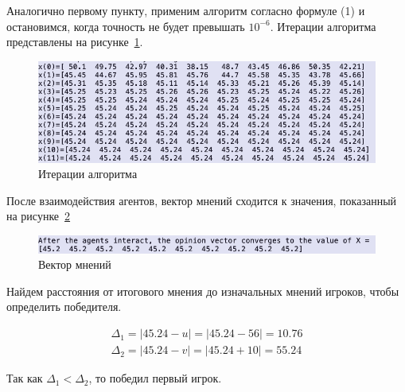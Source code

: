 Аналогично первому пункту, применим алгоритм согласно формуле (1) и остановимся, когда точность не будет
превышать $10^{-6}$. Итерации алгоритма представлены на рисунке~\ref{fig:fig07}.

\begin{figure}
  \centering
  \includegraphics[scale=0.6]{../../artifacts/lw6/7.png}
  \caption{Итерации алгоритма}
  \label{fig:fig07}
\end{figure}

После взаимодействия агентов, вектор мнений сходится к значения, показанный на рисунке~\ref{fig:fig08}

\begin{figure}
  \centering
  \includegraphics[scale=0.6]{../../artifacts/lw6/8.png}
  \caption{Вектор мнений}
  \label{fig:fig08}
\end{figure}

Найдем расстояния от итогового мнения до изначальных мнений игроков, чтобы определить победителя.

\begin{align*}
  \Delta_1 = \lvert 45.24 - u \rvert = \lvert 45.24 - 56 \rvert = 10.76 \\
  \Delta_2 = \lvert 45.24 - v \rvert = \lvert 45.24 + 10 \rvert = 55.24
\end{align*}

Так как $\Delta_1 < \Delta_2$, то победил первый игрок.
